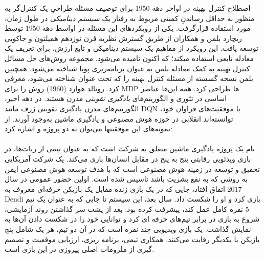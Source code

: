 اصطلاح کنترل بهینه
در اواخر دهه 1950
برای توصیف مسئله طراحیِ یک کنترل‌گر به منظور به حداقل رساندنِ کمیتی مربوط به رفتار یک \textit{سیستم دینامیکی} در طول زمان، مورد استفاده قرارگرفت. یکی از رویکردهای این مسئله در اواسط دهه 1950 توسط ریچارد بلمن و همکاران از طریق گسترش نظریه قرن نوزدهم همیلتون و جاکوبی
 توسعه یافت. این رویکرد از مفاهیم 
\textit{}
 یک سیستم دینامیکی و تابع ارزش، برای تعریف یک معادله تابعی استفاده می\nf کند؛ که اکنون 
 \textit{
 }
  نامیده می‌شود. مجموعه روش‌های حل مسائل کنترل بهینه به کمک معادله بلمن به عنوان برنامه‌ریزی پویا شناخته می‌شود. همچنین بلمن نسخه گسسته از مسئله کنترل بهینه را که تحت عنوان 
  \textit{
  } 
شناخته می‌شود، معرفی کرد. رونالد هوارد (1960) روش 
\textit{
}
را برای MDP‌‌ ها طراحی کرد. همه این‌ها عناصر اساسی در تئوری و الگوریتم‌های \textit{یادگیری تقویتی} مدرن هستند. در دهه اخیر، الگوریتم‌های مدرن یادگیری تقویتی  ژرف مانند DQN با موفقیت‌های فراوان خود، توانسته‌اند انقلابی در حوزه هوش مصنوعی و یادگیری ماشین به‌وجود آورند. از نمونه‌های این موفقیت\nf ها می‌توان به دو پروژه
 و
   اشاره کرد:
  
  \paragraph{}
    
   نام یک پروژه یادگیری ماشین متعلق به شرکت 
   است که به عنوان تیمی از ربات‌ها،  در بازی ویدئویی رقابتی پنج به پنج 
     در مقابل انسان‌ها بازی می‌کند.
 یک شرکت آمریکایی تحقیق و توسعه در زمینه هوش مصنوعی است که با هدف توسعه هوش مصنوعی ایمن به روشی که به نفع بشریت باشد تاسیس شده است. اولین حضور عمومی
  در سال 2017 اتفاق افتاد، جایی که در یک بازی زنده مقابل یک بازیکن حرفه‌ای معروف به Dendi بازی کرد و او را شکست داد. سال بعد، این سیستم تا جایی که به عنوان یک تیم 5 نفره کامل عمل کند، پیشرفت کرده بود. بعد از پشت سر گذاشتن روند آزمایشی، شروع به بازی در برابر تیم‌های حرفه ای کرد و توانایی خود را در شکست دادن آن‌ها به نمایش گذاشت. 
  یک بازی ویدیویی چند نفره است که در آن دو تیم، هر یک شامل پنج بازیکن با یکدیگر رقابت می‌کنند. همکاری تیمی، برنامه ریزی، ارزیابی موقعیت و تصمیم گیری از ملزومات اصلی پیروزی در این بازی است.
   
